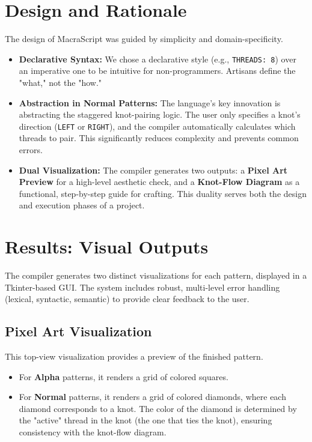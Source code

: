 \documentclass[conference]{IEEEtran}
\begin{document}
\section{Design and Rationale}
The design of MacraScript was guided by simplicity and domain-specificity.
\begin{itemize}[leftmargin=*]
    \item \textbf{Declarative Syntax:} We chose a declarative style (e.g., \texttt{THREADS: 8}) over an imperative one to be intuitive for non-programmers. Artisans define the "what," not the "how."
    \item \textbf{Abstraction in Normal Patterns:} The language's key innovation is abstracting the staggered knot-pairing logic. The user only specifies a knot's direction (\texttt{LEFT} or \texttt{RIGHT}), and the compiler automatically calculates which threads to pair. This significantly reduces complexity and prevents common errors.
    \item \textbf{Dual Visualization:} The compiler generates two outputs: a \textbf{Pixel Art Preview} for a high-level aesthetic check, and a \textbf{Knot-Flow Diagram} as a functional, step-by-step guide for crafting. This duality serves both the design and execution phases of a project.
\end{itemize}

\section{Results: Visual Outputs}
The compiler generates two distinct visualizations for each pattern, displayed in a Tkinter-based GUI. The system includes robust, multi-level error handling (lexical, syntactic, semantic) to provide clear feedback to the user.

\subsection{Pixel Art Visualization}
This top-view visualization provides a preview of the finished pattern.
\begin{itemize}
    \item For \textbf{Alpha} patterns, it renders a grid of colored squares.
    \item For \textbf{Normal} patterns, it renders a grid of colored diamonds, where each diamond corresponds to a knot. The color of the diamond is determined by the "active" thread in the knot (the one that ties the knot), ensuring consistency with the knot-flow diagram.
\end{itemize}
\end{document}
